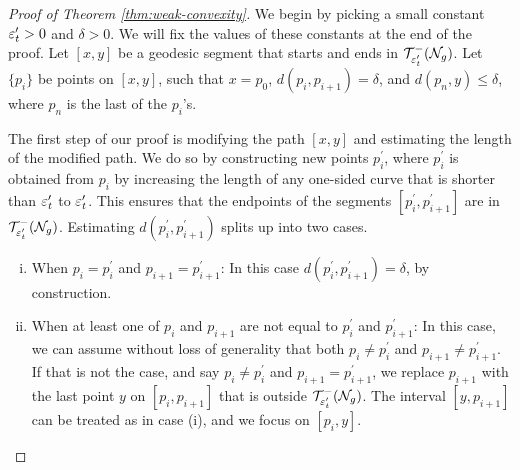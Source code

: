\begin{proof}[Proof of Theorem \ref{thm:weak-convexity}]
  We begin by picking a small constant $\varepsilon_t^{\prime} > 0$ and $\delta > 0$.
  We will fix the values of these constants at the end of the proof.
  Let $[x,y]$ be a geodesic segment that starts and ends in $\mathcal{T}_{\varepsilon_t^{\prime}}^{-}(\mathcal{N}_g)$.
  Let $\{p_i\}$ be points on $[x,y]$, such that $x = p_0$, $d(p_i, p_{i+1}) = \delta$, and $d(p_n, y) \leq \delta$, where $p_n$ is the last of the $p_i$'s.

  The first step of our proof is modifying the path $[x,y]$ and estimating the length of the modified path.
  We do so by constructing new points $p_i^{\prime}$, where $p_i^{\prime}$ is obtained from $p_i$ by increasing the length of any one-sided curve that is shorter than $\varepsilon_t^{\prime}$ to $\varepsilon_t^{\prime}$.
  This ensures that the endpoints of the segments $[p_i^{\prime}, p_{i+1}^{\prime}]$ are in $\mathcal{T}_{\varepsilon_t^{\prime}}^{-}(\mathcal{N}_g)$.
  Estimating $d(p_i^{\prime}, p_{i+1}^{\prime})$ splits up into two cases.
  \begin{enumerate}[(i)]
  \item When $p_i = p_i^{\prime}$ and $p_{i+1} = p_{i+1}^{\prime}$: In this case $d(p_i^{\prime}, p_{i+1}^{\prime}) = \delta$, by construction.
  \item When at least one of $p_i$ and $p_{i+1}$ are not equal to $p_i^{\prime}$ and $p_{i+1}^{\prime}$: In this case, we can assume without loss of generality that both $p_i \neq p_i^{\prime}$ and $p_{i+1} \neq p_{i+1}^{\prime}$.
    If that is not the case, and say $p_i \neq p_i^{\prime}$ and $p_{i+1} = p_{i+1}^{\prime}$, we replace $p_{i+1}$ with the last point $y$ on $[p_i, p_{i+1}]$ that is outside $\mathcal{T}_{\varepsilon_t^{\prime}}^{-}(\mathcal{N}_g)$.
    The interval $[y, p_{i+1}]$ can be treated as in case (i), and we focus on $[p_i, y]$.


\end{enumerate}
\end{proof}
